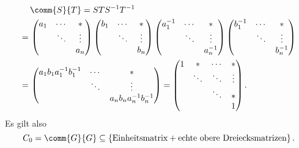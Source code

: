 \begin{align*}
   &\,   \comm{S}{T}
  =       S T S^{-1} T^{-1}
  \\
  =&\,    \begin{pmatrix}
            a_1 & \cdots  & *       \\
                & \ddots  & \vdots  \\
                &         & a_n
          \end{pmatrix}
          \begin{pmatrix}
            b_1 & \cdots  & *       \\
                & \ddots  & \vdots  \\
                &         & b_n
          \end{pmatrix}
          \begin{pmatrix}
            a_1^{-1}  & \cdots  & *       \\
                      & \ddots  & \vdots  \\
                      &         & a_n^{-1}
          \end{pmatrix}
          \begin{pmatrix}
            b_1^{-1}  & \cdots  & *       \\
                      & \ddots  & \vdots  \\
                      &         & b_n^{-1}
          \end{pmatrix}
  \\
  =&\,    \begin{pmatrix}
            a_1 b_1 a_1^{-1} b_1^{-1} & \cdots  & *                         \\
                                      & \ddots  & \vdots                    \\
                                      &         & a_n b_n a_n^{-1} b_n^{-1}
          \end{pmatrix}
  =       \begin{pmatrix}
            1 & *       & \cdots  & *       \\
              & \ddots  & \ddots  & \vdots  \\
              &         & \ddots  & *       \\
              &         &         & 1
          \end{pmatrix}.
\end{align*}
Es gilt also
\begin{equation}
  \label{equation: first commutator}
            C_0
  =         \comm{G}{G}
  \subseteq \{ \text{Einheitsmatrix} + \text{echte obere Dreiecksmatrizen} \}\,.
\end{equation}



